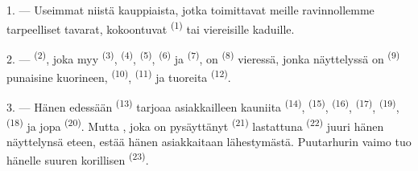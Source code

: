 %

\VUsaut{4.0mm}
\VUsaut{3.0mm}

\VUsaut{3.0mm}

1. --- Useimmat niistä kauppiaista, jotka toimittavat meille ravinnollemme
tarpeelliset tavarat, kokoontuvat 
 \textsuperscript{(1)} tai viereisille kaduille.

2. ---  \textsuperscript{(2)}, joka myy 
\textsuperscript{(3)},  \textsuperscript{(4)},
 \textsuperscript{(5)}, 
\textsuperscript{(6)} ja  \textsuperscript{(7)}, on
 \textsuperscript{(8)} vieressä, jonka
näyttelyssä on  \textsuperscript{(9)}
punaisine kuorineen,  \textsuperscript{(10)},
 \textsuperscript{(11)} ja tuoreita
 \textsuperscript{(12)}.

3. --- Hänen edessään  \textsuperscript{(13)}
tarjoaa asiakkailleen kauniita  \textsuperscript{(14)},
 \textsuperscript{(15)}, 
\textsuperscript{(16)},  \textsuperscript{(17)},
 \textsuperscript{(19)}, 
\textsuperscript{(18)} ja jopa  \textsuperscript{(20)}. Mutta
, joka on pysäyttänyt 
\textsuperscript{(21)} lastattuna 
\textsuperscript{(22)} juuri hänen näyttelynsä eteen, estää hänen asiakkaitaan
lähestymästä. Puutarhurin vaimo tuo hänelle suuren korillisen
 \textsuperscript{(23)}.

